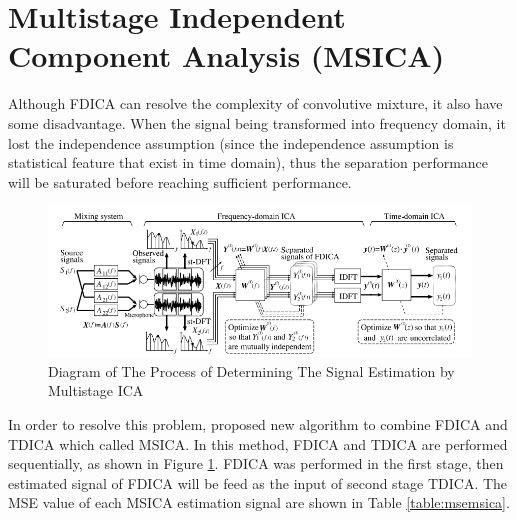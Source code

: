 \documentclass[a4paper]{jpconf}
\begin{document}

\section{Multistage Independent Component Analysis (MSICA)}
Although FDICA can resolve the complexity of convolutive mixture, it also have some disadvantage. When the signal being transformed into frequency domain, it lost the independence assumption (since the independence assumption is statistical feature that exist in time domain), thus the separation performance will be saturated before reaching sufficient performance. 

\begin{figure}[ht]
\begin{center}
\includegraphics[width=5.5in]{msica.png}
\end{center}
\caption{\label{pict:msica}Diagram of The Process of Determining The Signal Estimation by Multistage ICA}
\end{figure}

In order to resolve this problem, \cite{2} proposed new algorithm to combine FDICA and TDICA which called MSICA. In this method, FDICA and TDICA are performed sequentially, as shown in Figure \ref{pict:msica}. FDICA was performed in the first stage, then estimated signal of FDICA will be feed as the input of second stage TDICA. The MSE value of each MSICA estimation signal are shown in Table \ref{table:msemsica}.
\end{document}
